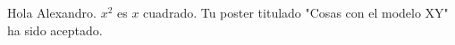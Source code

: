\documentclass{minimal}
\begin{document}
Hola Alexandro. $x^2$ es $x$ cuadrado.
Tu poster titulado "Cosas con el modelo XY" ha sido aceptado.
\end{document}
